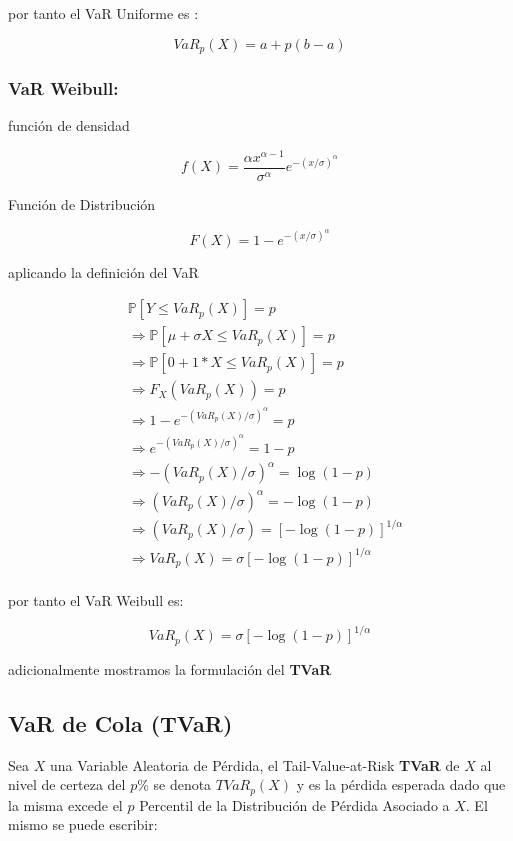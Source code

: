 \documentclass[]{article}
\begin{document}
por tanto el VaR Uniforme es :

\[VaR_{p}(X)=a+p(b-a)\]

\hypertarget{var-weibull}{%
\subsubsection{\texorpdfstring{\textbf{VaR
Weibull:}}{VaR Weibull:}}\label{var-weibull}}

función de densidad

\[f(X)= \frac{\alpha x^{\alpha-1}}{\sigma^{\alpha}}e^{-(x/\sigma)^\alpha}\]

Función de Distribución

\[F(X)= 1-e^{-(x/\sigma)^\alpha}\]

aplicando la definición del VaR

\[\begin{array}{rl}  
&\displaystyle \mathbb{P}[Y \leq VaR_{p}(X)]=p\\
&\displaystyle \Rightarrow \mathbb{P}[\mu + \sigma X \leq VaR_p(X)] = p\\
&\displaystyle \Rightarrow \mathbb{P}[0 + 1* X \leq VaR_p(X)] = p\\
&\displaystyle \Rightarrow F_X(VaR_{p}(X)) = p\\
&\displaystyle \Rightarrow 1-e^{-(VaR_{p}(X)/\sigma)^\alpha}=p\\
&\displaystyle \Rightarrow e^{-(VaR_{p}(X)/\sigma)^\alpha}=1-p\\
&\displaystyle \Rightarrow -(VaR_{p}(X)/\sigma)^\alpha=\log(1-p)\\
&\displaystyle \Rightarrow (VaR_{p}(X)/\sigma)^\alpha=-\log(1-p)\\
&\displaystyle \Rightarrow (VaR_{p}(X)/\sigma)=[-\log(1-p)]^{1/\alpha}\\
&\displaystyle \Rightarrow VaR_{p}(X)=\sigma [-\log(1-p)]^{1/\alpha}\\
\end{array}\]

por tanto el VaR Weibull es:

\[VaR_{p}(X)=\sigma [-\log(1-p)]^{1/\alpha}\]

adicionalmente mostramos la formulación del \textbf{TVaR}

\hypertarget{var-de-cola-tvar}{%
\subsection{VaR de Cola (TVaR)}\label{var-de-cola-tvar}}

Sea \(X\) una Variable Aleatoria de Pérdida, el Tail-Value-at-Risk
\textbf{TVaR} de \(X\) al nivel de certeza del \(p\)\% se denota
\(TVaR_{p}(X)\) y es la pérdida esperada dado que la misma excede el
\(p\) Percentil de la Distribución de Pérdida Asociado a \(X\). El mismo
se puede escribir:
\end{document}
